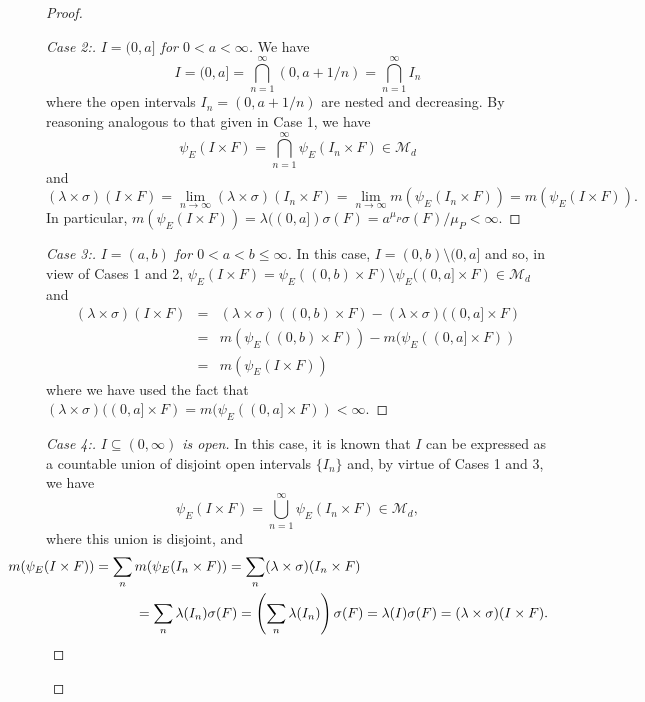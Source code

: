 \documentclass[11pt, letter]{book}
\newcommand*{\myproofname}{Proof}
\newenvironment{subproof}[1][\myproofname]{\begin{proof}[#1]\renewcommand*{\qedsymbol}{$\mathbin{/\mkern-6mu/}$}}{\end{proof}}
\begin{document}
\begin{proof}
\begin{subproof}[Case 2:]\textit{$I=(0,a]$ for $0<a<\infty$.} We have
\begin{equation*}
I=(0,a]=\bigcap_{n=1}^\infty (0,a+1/n)=\bigcap_{n=1}^\infty I_n
\end{equation*}
where the open intervals $I_n=(0,a+1/n)$ are nested and decreasing. By reasoning analogous to that given in Case 1, we have
\begin{equation*}
\psi_E(I\times F)=\bigcap_{n=1}^\infty \psi_E(I_n\times F)\in \mathcal{M}_d
\end{equation*}
and
\begin{equation*}
(\lambda\times\sigma)(I\times F)=\lim_{n\to\infty}(\lambda\times\sigma)(I_n\times F)=\lim_{n\to\infty}m(\psi_E(I_n\times F))=m(\psi_E(I\times F)).
\end{equation*}
In particular, $m(\psi_E(I\times F))=\lambda((0,a])\sigma(F)=a^{\mu_P}\sigma(F)/\mu_P<\infty.$
\end{subproof}
\begin{subproof}[Case 3:]\textit{$I=(a,b)$ for $0<a<b\leq \infty$.} In this case, $I=(0,b)\setminus (0,a]$ and so, in view of Cases 1 and 2, $\psi_E(I\times F)=\psi_E((0,b)\times F)\setminus \psi_E((0,a]\times F)\in\mathcal{M}_d$ and
\begin{eqnarray*}
(\lambda\times\sigma)(I\times F)&=&(\lambda\times\sigma)( (0,b)\times F)-(\lambda\times\sigma)((0,a]\times F)\\
&=&m(\psi_E((0,b)\times F))-m(\psi_E((0,a]\times F))\\
&=&m(\psi_E(I\times F))
\end{eqnarray*}
where we have used the fact that $(\lambda\times\sigma)((0,a]\times F)=m(\psi_E((0,a]\times F))<\infty$.
\end{subproof}
\begin{subproof}[Case 4:]\textit{$I\subseteq (0,\infty)$ is open.} In this case, it is known that $I$ can be expressed as a countable union of disjoint open intervals $\{I_n\}$ and, by virtue of Cases 1 and 3, we have
\begin{equation*}
\psi_E(I\times F)=\bigcup_{n=1}^\infty\psi_E(I_n\times F)\in\mathcal{M}_d,
\end{equation*}
where this union is disjoint, and
\begin{eqnarray*}
\lefteqn{\hspace{-1cm}m(\psi_E(I\times F))=\sum_n m(\psi_E(I_n\times F))=\sum_n (\lambda\times\sigma)(I_n\times F)}\\
&&\hspace{2cm}=\sum_n \lambda(I_n)\sigma(F)=\left(\sum_n \lambda(I_n)\right)\sigma(F)=\lambda(I)\sigma(F)=(\lambda\times\sigma)(I\times F).

\end{eqnarray*}
\end{subproof}
\end{proof}
\end{document}
